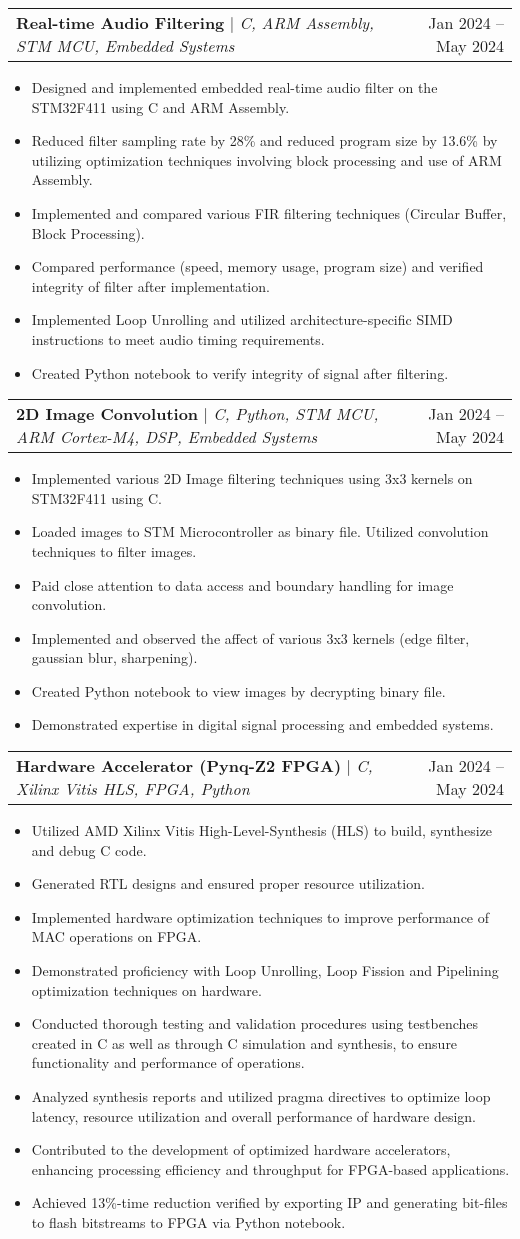 \documentclass[A4,10pt]{article}
\makeatletter
\newcommand{\resumeItem}[1]{
  \item\small{
    {#1 \vspace{-2pt}}
  }
}
\newcommand{\resumeProjectHeading}[2]{
    \item
    \begin{tabular*}{0.97\textwidth}{l@{\extracolsep{\fill}}r}
      \small#1 & #2 \\
    \end{tabular*}\vspace{-7pt}
}
\newcommand{\resumeItemListStart}{\begin{itemize}}
\newcommand{\resumeItemListEnd}{\end{itemize}\vspace{-5pt}}
\makeatother
\begin{document}
        \resumeProjectHeading
        {\textbf{Real-time Audio Filtering} $|$ \emph{C, ARM Assembly, STM MCU, Embedded Systems}}{Jan 2024 -- May 2024}
        \resumeItemListStart
          \resumeItem{Designed and implemented embedded real-time audio filter on the STM32F411 using C and ARM Assembly.}
          \resumeItem{Reduced filter sampling rate by 28\% and reduced program size by 13.6\% by utilizing optimization techniques involving block processing and use of ARM Assembly.}
          \resumeItem{Implemented and compared various FIR filtering techniques (Circular Buffer, Block Processing).}
          \resumeItem{Compared performance (speed, memory usage, program size) and verified integrity of filter after implementation.}
          \resumeItem{Implemented Loop Unrolling and utilized architecture-specific SIMD instructions to meet audio timing requirements.}
          \resumeItem{Created Python notebook to verify integrity of signal after filtering.}
        \resumeItemListEnd
        
        \resumeProjectHeading
        {\textbf{2D Image Convolution} $|$ \emph{C, Python, STM MCU, ARM Cortex-M4, DSP, Embedded Systems}}{Jan 2024 -- May 2024}
        \resumeItemListStart
          \resumeItem{Implemented various 2D Image filtering techniques using 3x3 kernels on STM32F411 using C.}
          \resumeItem{Loaded images to STM Microcontroller as binary file. Utilized convolution techniques to filter images.}
          \resumeItem{Paid close attention to data access and boundary handling for image convolution.}
          \resumeItem{Implemented and observed the affect of various 3x3 kernels (edge filter, gaussian blur, sharpening).}
          \resumeItem{Created Python notebook to view images by decrypting binary file.}
          \resumeItem{Demonstrated expertise in digital signal processing and embedded systems.}
        \resumeItemListEnd

        \resumeProjectHeading
        {\textbf{Hardware Accelerator (Pynq-Z2 FPGA)} $|$ \emph{C, Xilinx Vitis HLS, FPGA, Python}}{Jan 2024 -- May 2024}
        \resumeItemListStart
          \resumeItem{Utilized AMD Xilinx Vitis High-Level-Synthesis (HLS) to build, synthesize and debug C code.}
          \resumeItem{Generated RTL designs and ensured proper resource utilization.}
          \resumeItem{Implemented hardware optimization techniques to improve performance of MAC operations on FPGA.}
          \resumeItem{Demonstrated proficiency with Loop Unrolling, Loop Fission and Pipelining optimization techniques on hardware.}
          \resumeItem{Conducted thorough testing and validation procedures using testbenches created in C as well as through C simulation and synthesis, to ensure functionality and performance of operations.}
          \resumeItem{Analyzed synthesis reports and utilized pragma directives to optimize loop latency, resource utilization and overall performance of hardware design.}
          \resumeItem{Contributed to the development of optimized hardware accelerators, enhancing processing efficiency and throughput for FPGA-based applications.}
          \resumeItem{Achieved 13\%-time reduction verified by exporting IP and generating bit-files to flash bitstreams to FPGA via Python notebook.}
        \resumeItemListEnd
\end{document}

